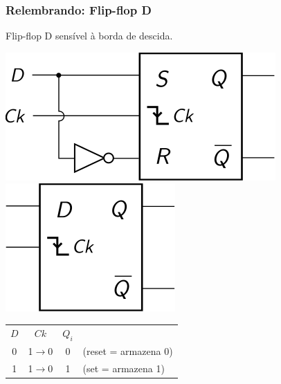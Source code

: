 \documentclass{beamer}
\begin{document}
\begin{frame}
\frametitle{Relembrando: Flip-flop D}

Flip-flop D sensível à borda de descida.

\begin{center}
\includegraphics{images/flipflopD_circuit}%
\hspace{3ex}%
\raisebox{40pt}{\Huge$=$}%
\hspace{3ex}%
\includegraphics{images/flipflopD_blackbox}

\vspace{12pt}

\begin{tabular}{cc||cl}
 $D$ &        $Ck$       & $Q_i$ \\
\cline{1-3}
  0  &  1$\rightarrow$0  &     0      & (reset = armazena 0) \\
  1  &  1$\rightarrow$0  &     1      & (set = armazena 1) \\
\end{tabular}
\end{center}

\end{frame}
\end{document}
